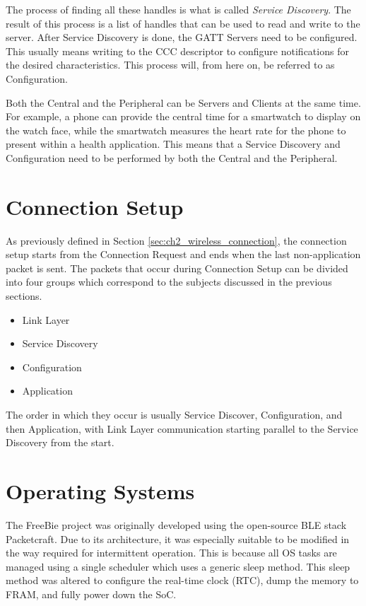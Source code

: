 The process of finding all these handles is what is called \textit{Service Discovery}. The result of this process is a list of handles that can be used to read and write to the server. After Service Discovery is done, the GATT Servers need to be configured. This usually means writing to the CCC descriptor to configure notifications for the desired characteristics. This process will, from here on, be referred to as Configuration. 

Both the Central and the Peripheral can be Servers and Clients at the same time. For example, a phone can provide the central time for a smartwatch to display on the watch face, while the smartwatch measures the heart rate for the phone to present within a health application. This means that a Service Discovery and Configuration need to be performed by both the Central and the Peripheral.

\section{Connection Setup}
As previously defined in Section \ref{sec:ch2_wireless_connection}, the connection setup starts from the Connection Request and ends when the last non-application packet is sent. The packets that occur during Connection Setup can be divided into four groups which correspond to the subjects discussed in the previous sections.
\begin{itemize}
    \item Link Layer
    \item Service Discovery
    \item Configuration
    \item Application
\end{itemize} 
The order in which they occur is usually Service Discover, Configuration, and then Application, with Link Layer communication starting parallel to the Service Discovery from the start.

\section{Operating Systems}
The FreeBie project was originally developed using the open-source BLE stack Packetcraft. Due to its architecture, it was especially suitable to be modified in the way required for intermittent operation. This is because all OS tasks are managed using a single scheduler which uses a generic sleep method. This sleep method was altered to configure the real-time clock (RTC), dump the memory to FRAM, and fully power down the SoC.

